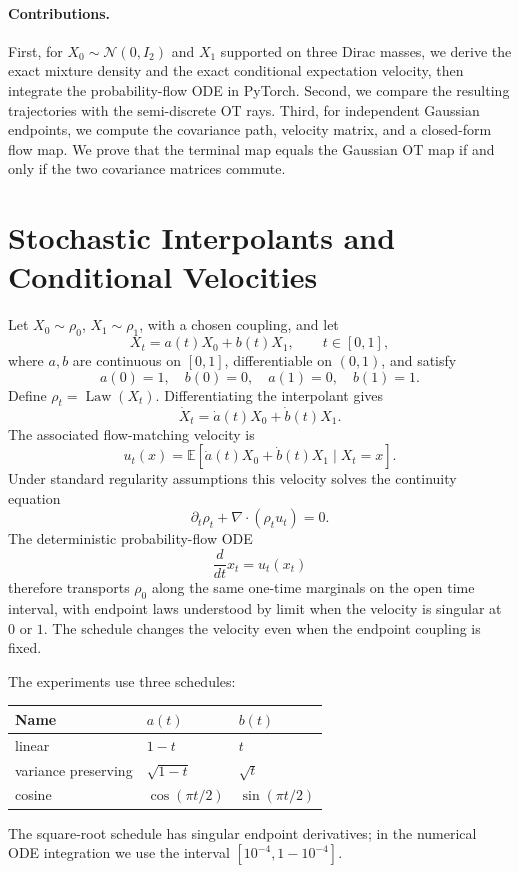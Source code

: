 \documentclass[11pt]{article}
\DeclareMathOperator{\Law}{Law}
\begin{document}
\paragraph{Contributions.}
First, for \(X_0\sim\mathcal N(0,I_2)\) and \(X_1\) supported on three Dirac
masses, we derive the exact mixture density and the exact conditional
expectation velocity, then integrate the probability-flow ODE in PyTorch.
Second, we compare the resulting trajectories with the semi-discrete OT rays.
Third, for independent Gaussian endpoints, we compute the covariance path,
velocity matrix, and a closed-form flow map.  We prove that the terminal map
equals the Gaussian OT map if and only if the two covariance matrices commute.

\section{Stochastic Interpolants and Conditional Velocities}

Let \(X_0\sim\rho_0\), \(X_1\sim\rho_1\), with a chosen coupling, and let
\[
        X_t=a(t)X_0+b(t)X_1,\qquad t\in[0,1],
\]
where \(a,b\) are continuous on \([0,1]\), differentiable on \((0,1)\), and satisfy
\[
        a(0)=1,\quad b(0)=0,\quad a(1)=0,\quad b(1)=1 .
\]
Define \(\rho_t=\Law(X_t)\).  Differentiating the interpolant gives
\[
        \dot X_t=\dot a(t)X_0+\dot b(t)X_1 .
\]
The associated flow-matching velocity is
\begin{equation}
        u_t(x)=
        \mathbb E[\dot a(t)X_0+\dot b(t)X_1\mid X_t=x].
        \label{eq:conditional-velocity}
\end{equation}
Under standard regularity assumptions this velocity solves the continuity
equation
\[
        \partial_t\rho_t+\nabla\cdot(\rho_t u_t)=0.
\]
The deterministic probability-flow ODE
\[
        \frac{d}{dt}x_t=u_t(x_t)
\]
therefore transports \(\rho_0\) along the same one-time marginals on the open
time interval, with endpoint laws understood by limit when the velocity is
singular at \(0\) or \(1\).  The schedule changes the velocity even when the
endpoint coupling is fixed.

The experiments use three schedules:
\begin{center}
\begin{tabular}{lll}
\toprule
Name & \(a(t)\) & \(b(t)\) \\
\midrule
linear & \(1-t\) & \(t\) \\
variance preserving & \(\sqrt{1-t}\) & \(\sqrt t\) \\
cosine & \(\cos(\pi t/2)\) & \(\sin(\pi t/2)\) \\
\bottomrule
\end{tabular}
\end{center}
The square-root schedule has singular endpoint derivatives; in the numerical
ODE integration we use the interval \([10^{-4},1-10^{-4}]\).
\end{document}

